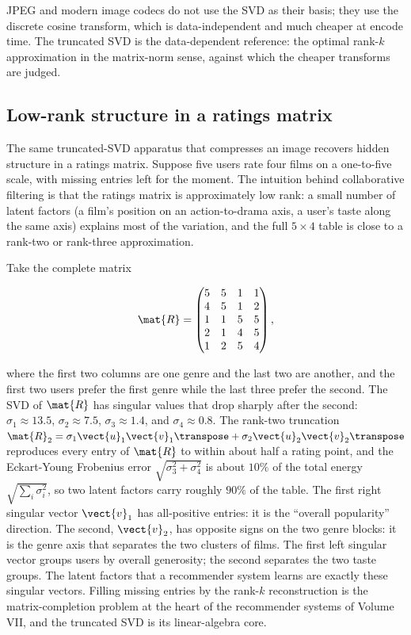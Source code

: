 JPEG and modern image codecs do not use the SVD as their basis; they
use the discrete cosine transform, which is data-independent and
much cheaper at encode time. The truncated SVD is the
data-dependent reference: the optimal rank-$k$ approximation in the
matrix-norm sense, against which the cheaper transforms are judged.

\subsection{Low-rank structure in a ratings matrix}

The same truncated-SVD apparatus that compresses an image recovers
hidden structure in a ratings matrix. Suppose five users rate four
films on a one-to-five scale, with missing entries left for the
moment. The intuition behind collaborative filtering is that the
ratings matrix is approximately low rank: a small number of latent
factors (a film's position on an action-to-drama axis, a user's
taste along the same axis) explains most of the variation, and the
full $5 \times 4$ table is close to a rank-two or rank-three
approximation.

Take the complete matrix

\[
\mat{R} = \begin{pmatrix}
5 & 5 & 1 & 1 \\
4 & 5 & 1 & 2 \\
1 & 1 & 5 & 5 \\
2 & 1 & 4 & 5 \\
1 & 2 & 5 & 4
\end{pmatrix},
\]

where the first two columns are one genre and the last two are
another, and the first two users prefer the first genre while the
last three prefer the second. The SVD of $\mat{R}$ has singular
values that drop sharply after the second: $\sigma_{1} \approx 13.5$,
$\sigma_{2} \approx 7.5$, $\sigma_{3} \approx 1.4$, and $\sigma_{4}
\approx 0.8$. The rank-two truncation $\mat{R}_{2} = \sigma_{1}
\vect{u}_{1}\vect{v}_{1}\transpose + \sigma_{2}\vect{u}_{2}
\vect{v}_{2}\transpose$ reproduces every entry of $\mat{R}$ to within
about half a rating point, and the Eckart-Young Frobenius error
$\sqrt{\sigma_{3}^{2} + \sigma_{4}^{2}}$ is about $10\%$ of the
total energy $\sqrt{\sum_{i}\sigma_{i}^{2}}$, so two latent factors
carry roughly $90\%$ of the table. The first right
singular vector $\vect{v}_{1}$ has all-positive entries: it is the
``overall popularity'' direction. The second, $\vect{v}_{2}$, has
opposite signs on the two genre blocks: it is the genre axis that
separates the two clusters of films. The first left singular vector
groups users by overall generosity; the second separates the two
taste groups. The latent factors that a recommender system learns
are exactly these singular vectors. Filling missing entries by the
rank-$k$ reconstruction is the matrix-completion problem at the
heart of the recommender systems of Volume VII, and the truncated
SVD is its linear-algebra core.


